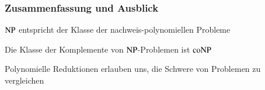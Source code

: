 \documentclass[aspectratio=1610,onlymath]{beamer}
\begin{document}
\begin{frame}\frametitle{Zusammenfassung und Ausblick}

${\textsc{NP}}$ entspricht der Klasse der nachweis-polynomiellen Probleme
\bigskip

Die Klasse der Komplemente von ${\textsc{NP}}$-Problemen ist ${\textsc{coNP}}$\bigskip

Polynomielle Reduktionen erlauben uns, die Schwere von Problemen zu vergleichen
\bigskip



\end{frame}
\end{document}
